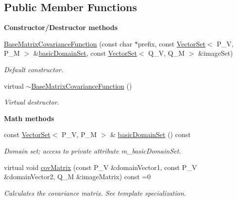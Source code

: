 \subsection*{Public Member Functions}
\begin{Indent}{\bf Constructor/\-Destructor methods}\par
\begin{DoxyCompactItemize}
\item 
\hyperlink{class_q_u_e_s_o_1_1_base_matrix_covariance_function_aa19fd2a4d2cc8ce822d4712abbd45021}{Base\-Matrix\-Covariance\-Function} (const char $\ast$prefix, const \hyperlink{class_q_u_e_s_o_1_1_vector_set}{Vector\-Set}$<$ P\-\_\-\-V, P\-\_\-\-M $>$ \&\hyperlink{class_q_u_e_s_o_1_1_base_matrix_covariance_function_a6ce876e4dae5ab4b165ac100e310dd45}{basic\-Domain\-Set}, const \hyperlink{class_q_u_e_s_o_1_1_vector_set}{Vector\-Set}$<$ Q\-\_\-\-V, Q\-\_\-\-M $>$ \&image\-Set)
\begin{DoxyCompactList}\small\item\em Default constructor. \end{DoxyCompactList}\item 
virtual \hyperlink{class_q_u_e_s_o_1_1_base_matrix_covariance_function_a821c7190922a832ecc4ae3bcc78b99cc}{$\sim$\-Base\-Matrix\-Covariance\-Function} ()
\begin{DoxyCompactList}\small\item\em Virtual destructor. \end{DoxyCompactList}\end{DoxyCompactItemize}
\end{Indent}
\begin{Indent}{\bf Math methods}\par
\begin{DoxyCompactItemize}
\item 
const \hyperlink{class_q_u_e_s_o_1_1_vector_set}{Vector\-Set}$<$ P\-\_\-\-V, P\-\_\-\-M $>$ \& \hyperlink{class_q_u_e_s_o_1_1_base_matrix_covariance_function_a6ce876e4dae5ab4b165ac100e310dd45}{basic\-Domain\-Set} () const 
\begin{DoxyCompactList}\small\item\em Domain set; access to private attribute m\-\_\-basic\-Domain\-Set. \end{DoxyCompactList}\item 
virtual void \hyperlink{class_q_u_e_s_o_1_1_base_matrix_covariance_function_af1ae061b09f7b4187d2ba8920ced6074}{cov\-Matrix} (const P\-\_\-\-V \&domain\-Vector1, const P\-\_\-\-V \&domain\-Vector2, Q\-\_\-\-M \&image\-Matrix) const =0
\begin{DoxyCompactList}\small\item\em Calculates the covariance matrix. See template specialization. \end{DoxyCompactList}\end{DoxyCompactItemize}
\end{Indent}
